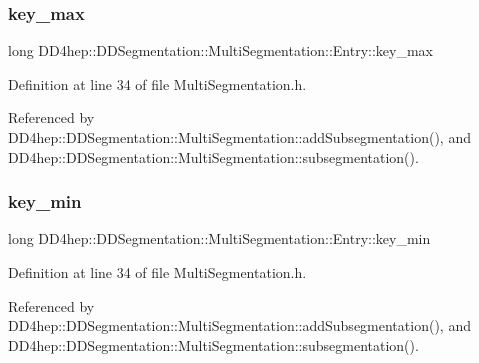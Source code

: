 \subsubsection{\texorpdfstring{key\+\_\+max}{key\_max}}
{\footnotesize\ttfamily long D\+D4hep\+::\+D\+D\+Segmentation\+::\+Multi\+Segmentation\+::\+Entry\+::key\+\_\+max}



Definition at line 34 of file Multi\+Segmentation.\+h.



Referenced by D\+D4hep\+::\+D\+D\+Segmentation\+::\+Multi\+Segmentation\+::add\+Subsegmentation(), and D\+D4hep\+::\+D\+D\+Segmentation\+::\+Multi\+Segmentation\+::subsegmentation().

\hypertarget{struct_d_d4hep_1_1_d_d_segmentation_1_1_multi_segmentation_1_1_entry_a45ab402e1cc51a736d358270935ce0b1}{}\label{struct_d_d4hep_1_1_d_d_segmentation_1_1_multi_segmentation_1_1_entry_a45ab402e1cc51a736d358270935ce0b1} 
\subsubsection{\texorpdfstring{key\+\_\+min}{key\_min}}
{\footnotesize\ttfamily long D\+D4hep\+::\+D\+D\+Segmentation\+::\+Multi\+Segmentation\+::\+Entry\+::key\+\_\+min}



Definition at line 34 of file Multi\+Segmentation.\+h.



Referenced by D\+D4hep\+::\+D\+D\+Segmentation\+::\+Multi\+Segmentation\+::add\+Subsegmentation(), and D\+D4hep\+::\+D\+D\+Segmentation\+::\+Multi\+Segmentation\+::subsegmentation().

\hypertarget{struct_d_d4hep_1_1_d_d_segmentation_1_1_multi_segmentation_1_1_entry_a1850766ca41dccd7dfdc11806d4eef34}{}\label{struct_d_d4hep_1_1_d_d_segmentation_1_1_multi_segmentation_1_1_entry_a1850766ca41dccd7dfdc11806d4eef34} 
